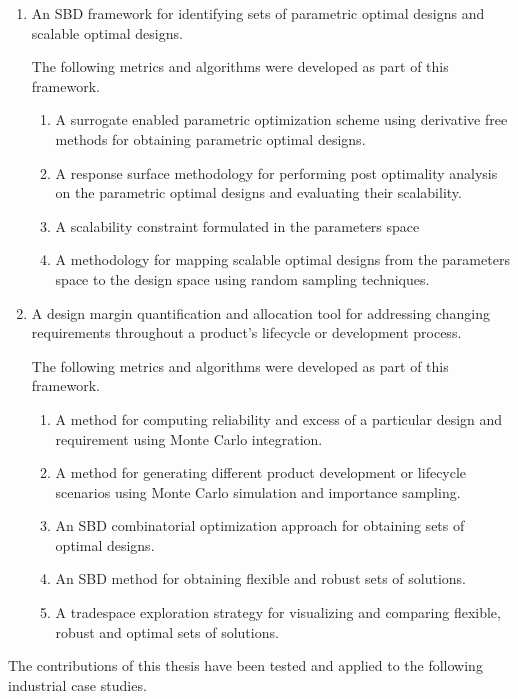 \begin{enumerate}
	\item{An \ac{SBD} framework for identifying sets of parametric optimal designs and scalable optimal designs.}
	
	The following metrics and algorithms were developed as part of this framework.
	
	\begin{enumerate}
		\item{A surrogate enabled parametric optimization scheme using derivative free methods for obtaining parametric optimal designs.}
		\item{A response surface methodology for performing post optimality analysis on the parametric optimal designs and evaluating their scalability.}
		\item{A scalability constraint formulated in the parameters space}
		\item{A methodology for mapping scalable optimal designs from the parameters space to the design space using random sampling techniques.}
	\end{enumerate}
	\item{A design margin quantification and allocation tool for addressing changing requirements throughout a product's lifecycle or development process.}
	
	The following metrics and algorithms were developed as part of this framework.
	
	\begin{enumerate}
		\item{A method for computing reliability and excess of a particular design and requirement using Monte Carlo integration.}
		\item{A method for generating different product development or lifecycle scenarios using Monte Carlo simulation and importance sampling.}
		\item{An \ac{SBD} combinatorial optimization approach for obtaining sets of optimal designs.}
		\item{An \ac{SBD} method for obtaining flexible and robust sets of solutions.}
		\item{A tradespace exploration strategy for visualizing and comparing flexible, robust and optimal sets of solutions.}
	\end{enumerate}
\end{enumerate}

The contributions of this thesis have been tested and applied to the following industrial case studies.

